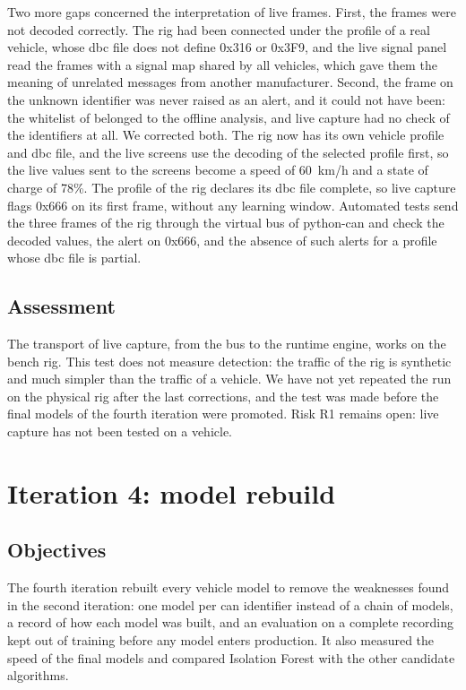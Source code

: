 Two more gaps concerned the interpretation of live frames. First, the frames were not decoded correctly. The rig had been connected under the profile of a real vehicle, whose \gls{dbc} file does not define 0x316 or 0x3F9, and the live signal panel read the frames with a signal map shared by all vehicles, which gave them the meaning of unrelated messages from another manufacturer. Second, the frame on the unknown identifier was never raised as an alert, and it could not have been: the whitelist of  belonged to the offline analysis, and live capture had no check of the identifiers at all. We corrected both. The rig now has its own vehicle profile and \gls{dbc} file, and the live screens use the decoding of the selected profile first, so the live values sent to the screens become a speed of 60~km/h and a state of charge of 78\%. The profile of the rig declares its \gls{dbc} file complete, so live capture flags 0x666 on its first frame, without any learning window. Automated tests send the three frames of the rig through the virtual bus of python-can and check the decoded values, the alert on 0x666, and the absence of such alerts for a profile whose \gls{dbc} file is partial.

\subsection{Assessment}

The transport of live capture, from the bus to the runtime engine, works on the bench rig. This test does not measure detection: the traffic of the rig is synthetic and much simpler than the traffic of a vehicle. We have not yet repeated the run on the physical rig after the last corrections, and the test was made before the final models of the fourth iteration were promoted. Risk R1 remains open: live capture has not been tested on a vehicle.

\section{Iteration 4: model rebuild}
\label{sec:it4}

\subsection{Objectives}

The fourth iteration rebuilt every vehicle model to remove the weaknesses found in the second iteration: one model per \gls{can} identifier instead of a chain of models, a record of how each model was built, and an evaluation on a complete recording kept out of training before any model enters production. It also measured the speed of the final models and compared Isolation Forest with the other candidate algorithms.


